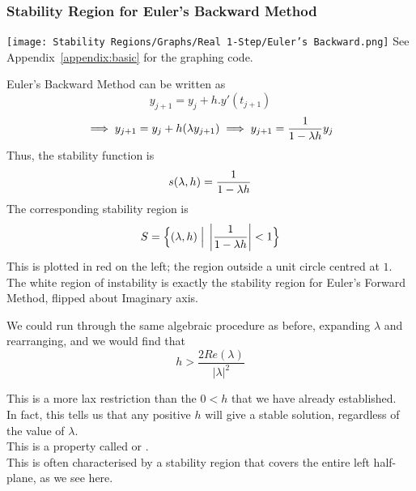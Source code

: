 \subsubsection{Stability Region for Euler's Backward Method}
\begin{multicols}{2}
\vspace*{\fill}
\begin{center}
\texttt{[image: Stability Regions/Graphs/Real 1-Step/Euler's Backward.png]}
See Appendix~\ref{appendix:basic} for the graphing code.\\
\end{center}
\vspace*{\fill}
\columnbreak{}
Euler's Backward Method can be written as
\[y_{j+1} = y_j + h.y'(t_{j+1})\]
\[\implies y_{j+1} = y_j + h(\lambda y_{j+1}) \implies y_{j+1} = \frac{1}{1 - \lambda h}y_j\]
Thus, the stability function is
\[s(\lambda, h) = \frac{1}{1 - \lambda h}\]
The corresponding stability region is
\[S = \Big\{ (\lambda, h) \;\Big|\; \left|\frac{1}{1 - \lambda h}\right| < 1\Big\}\]
This is plotted in red on the left; the region outside a unit circle centred at $1$.\\
The white region of instability is exactly the stability region for Euler's Forward Method, flipped about Imaginary axis.\\

\par We could run through the same algebraic procedure as before, expanding $\lambda$ and rearranging, and we would find that 
\[h > \frac{2 Re(\lambda)}{{|\lambda|}^2}\]
\end{multicols}
This is a more lax restriction than the $0<h$ that we have already established.\\
In fact, this tells us that any positive $h$ will give a stable solution, regardless of the value of $\lambda$.\\
This is a property called  or .\\
This is often characterised by a stability region that covers the entire left half-plane, as we see here.\\

